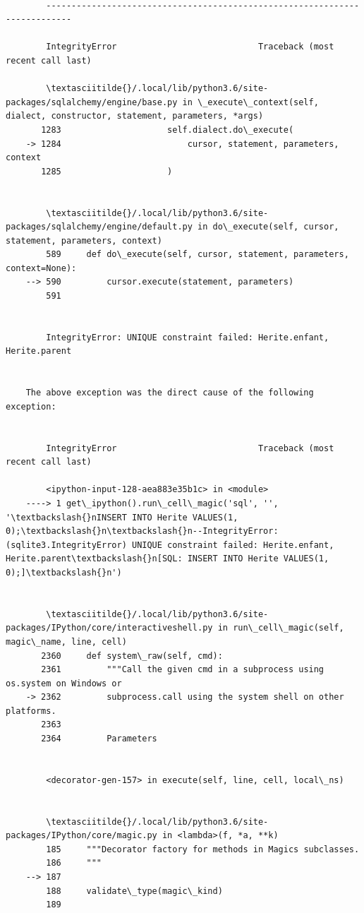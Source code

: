 \documentclass[11pt]{article}
\begin{document}
    \begin{Verbatim}[commandchars=\\\{\}]

        ---------------------------------------------------------------------------

        IntegrityError                            Traceback (most recent call last)

        \textasciitilde{}/.local/lib/python3.6/site-packages/sqlalchemy/engine/base.py in \_execute\_context(self, dialect, constructor, statement, parameters, *args)
       1283                     self.dialect.do\_execute(
    -> 1284                         cursor, statement, parameters, context
       1285                     )


        \textasciitilde{}/.local/lib/python3.6/site-packages/sqlalchemy/engine/default.py in do\_execute(self, cursor, statement, parameters, context)
        589     def do\_execute(self, cursor, statement, parameters, context=None):
    --> 590         cursor.execute(statement, parameters)
        591 


        IntegrityError: UNIQUE constraint failed: Herite.enfant, Herite.parent

        
    The above exception was the direct cause of the following exception:


        IntegrityError                            Traceback (most recent call last)

        <ipython-input-128-aea883e35b1c> in <module>
    ----> 1 get\_ipython().run\_cell\_magic('sql', '', '\textbackslash{}nINSERT INTO Herite VALUES(1, 0);\textbackslash{}n\textbackslash{}n--IntegrityError: (sqlite3.IntegrityError) UNIQUE constraint failed: Herite.enfant, Herite.parent\textbackslash{}n[SQL: INSERT INTO Herite VALUES(1, 0);]\textbackslash{}n')
    

        \textasciitilde{}/.local/lib/python3.6/site-packages/IPython/core/interactiveshell.py in run\_cell\_magic(self, magic\_name, line, cell)
       2360     def system\_raw(self, cmd):
       2361         """Call the given cmd in a subprocess using os.system on Windows or
    -> 2362         subprocess.call using the system shell on other platforms.
       2363 
       2364         Parameters


        <decorator-gen-157> in execute(self, line, cell, local\_ns)


        \textasciitilde{}/.local/lib/python3.6/site-packages/IPython/core/magic.py in <lambda>(f, *a, **k)
        185     """Decorator factory for methods in Magics subclasses.
        186     """
    --> 187 
        188     validate\_type(magic\_kind)
        189 



\end{Verbatim}
\end{document}
